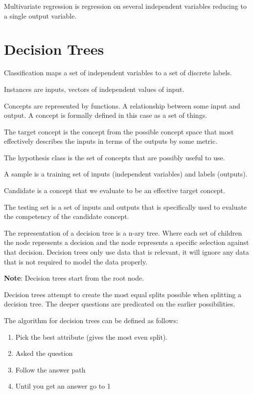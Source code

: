 \documentclass{article}
\begin{document}
Multivariate regression is regression on several independent variables reducing
to a single output variable.

\section{Decision Trees}

Classification maps a set of independent variables to a set of discrete labels.

Instances are inputs, vectors of independent values of input. 

Concepts are represented by functions. A relationship between some input and
output. A concept is formally defined in this case as a set of things.

The target concept is the concept from the possible concept space that most 
effectively describes the inputs in terms of the outputs by some metric.

The hypothesis class is the set of concepts that are possibly useful to use.

A sample is a training set of inputs (independent variables) and labels
(outputs). 

Candidate is a concept that we evaluate to be an effective target concept.

The testing set is a set of inputs and outputs that is specifically used to 
evaluate the competency of the candidate concept. 

The representation of a decision tree is a n-ary tree. Where each set of
children the node represents a decision and the node represents a specific 
selection against that decision. Decision trees only use data that is relevant,
it will ignore any data that is not required to model the data properly.

\textbf{Note}: Decision trees start from the root node. 

Decision trees attempt to create the most equal splits possible when splitting
a decision tree. The deeper questions are predicated on the earlier
possibilities. 

The algorithm for decision trees can be defined as follows:
\begin{enumerate}
        \item Pick the best attribute (gives the most even split).
        \item Asked the question
        \item Follow the answer path
        \item Until you get an answer go to 1
\end{enumerate}
\end{document}
